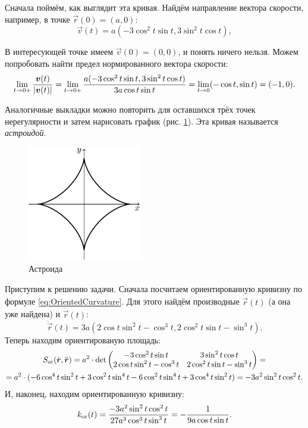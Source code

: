 \begin{solution}
	Сначала поймём, как выглядит эта кривая. Найдём направление вектора скорости, например, в точке $\vec{r}(0) = (a, 0)$:
	\[
		\vec{v}(t) = a(-3\cos^2t\sin t, 3\sin^2t\cos t),
	\]

	В интересующей точке имеем $\vec{v}(0) = (0, 0)$, и понять ничего нельзя. Можем попробовать найти предел нормированного вектора скорости:
	\[
		\lim_{t \to 0+}\frac{\boldsymbol{v}(t)}{\left\lvert\boldsymbol{v}(t)\right\rvert} = \lim_{t \to 0+}\frac{a(-3\cos^2t\sin t, 3\sin^2t\cos t)}{3a\cos t\sin t} = \lim_{t \to 0}(-\cos t, \sin t) = (-1, 0).
	\]

	Аналогичные выкладки можно повторить для оставшихся трёх точек нерегулярности и затем нарисовать график (рис. \ref{fig:Astroid}). Эта кривая называется \textit{астроидой}.

	\begin{figure}[h]
		\centering
		\includegraphics[width=5cm]{./img/Astroid.pdf}
		\caption{Астроида}
		\label{fig:Astroid}
	\end{figure}

	Приступим к решению задачи. Сначала посчитаем ориентированную кривизну по формуле \eqref{eq:OrientedCurvature}. Для этого найдём производные $\dot{\vec{r}}(t)$ (а она уже найдена) и $\ddot{\vec{r}}(t)$:
	\[
		\ddot{\vec{r}}(t) = 3a(2\cos t\sin^2t - \cos^3t, 2\cos^2t\sin t - \sin^3t).
	\]
	Теперь находим ориентированую площадь:
	\begin{multline*}
		S_{\mathrm{or}}(\dot{\boldsymbol{r}}, \ddot{\boldsymbol{r}}) = a^2 \cdot \det
		\begin{pmatrix}
			-3\cos^2t\sin t & 3\sin^2t\cos t\\
			2\cos t\sin^2 t - \cos^3t & 2\cos^2t\sin t - \sin^3t
		\end{pmatrix} = \\ = a^2 \cdot (-6\cos^4t\sin^2t + 3\cos^2t\sin^4t - 6\cos^2t\sin^4t + 3\cos^4t\sin^2t) = -3a^2\sin^2t\cos^2t.
	\end{multline*}
	И, наконец, находим ориентированную кривизну:
	\[
		k_{\mathrm{or}}(t) = \frac{-3a^2\sin^2t\cos^2t}{27a^3\cos^3t\sin^3t} = -\frac{1}{9a\cos t\sin t}.
	\]


\end{solution}
